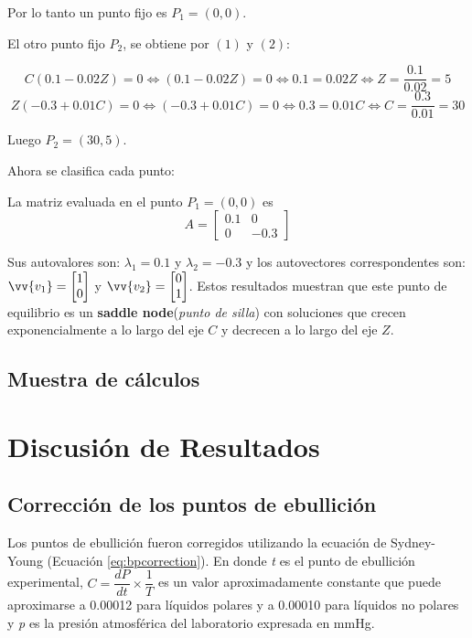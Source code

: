 \documentclass[12pt,letterpaper]{article}
\begin{document}
Por lo tanto un punto fijo es $P_1 = (0, 0)$. 

El otro punto fijo $P_2$, se obtiene por $(1)$ y $(2)$: 

$$C(0.1 - 0.02 Z) = 0 \iff (0.1 - 0.02 Z) = 0 \iff 0.1 = 0.02 Z \iff Z = \dfrac{0.1}{0.02} = 5$$ 
$$Z(-0.3 + 0.01 C) = 0 \iff (-0.3 + 0.01 C) = 0 \iff 0.3 = 0.01 C \iff C = \dfrac{0.3}{0.01} = 30 $$ 

Luego $P_2 = (30, 5)$. 


Ahora se clasifica cada punto:

La matriz evaluada en el punto $P_1 = (0, 0)$ es 
$$A = \begin{bmatrix}
0.1 & 0 \\
0 & -0.3   
\end{bmatrix}$$

Sus autovalores son: $\lambda_1 = 0.1$ y $\lambda_2 = -0.3$ y los autovectores correspondentes son: $\vv{v_1} = \begin{bmatrix}1 \\ 0\end{bmatrix}$ y $\vv{v_2} = \begin{bmatrix}0 \\ 1\end{bmatrix}$. Estos resultados muestran que este punto de equilibrio es un \textbf{saddle node}(\textit{punto de silla}) con soluciones que crecen exponencialmente a lo largo del eje $C$ y decrecen a lo largo del eje $Z$.



\subsection{Muestra de cálculos}



\section{Discusión de Resultados\label{sec:discusion}}

\subsection{Corrección de los puntos de ebullición}

Los puntos de ebullición fueron corregidos utilizando la ecuación de Sydney-Young\autocite{young:1902} (Ecuación \ref{eq:bpcorrection}). En donde \textit{t} es el punto de ebullición experimental, $C = \dfrac{dP}{dt} \times \dfrac{1}{T}$ es un valor aproximadamente constante que puede aproximarse a \num{0.00012} para líquidos polares y a \num{0.00010} para líquidos no polares y \textit{p} es la presión atmosférica del laboratorio expresada en mmHg.
\end{document}
